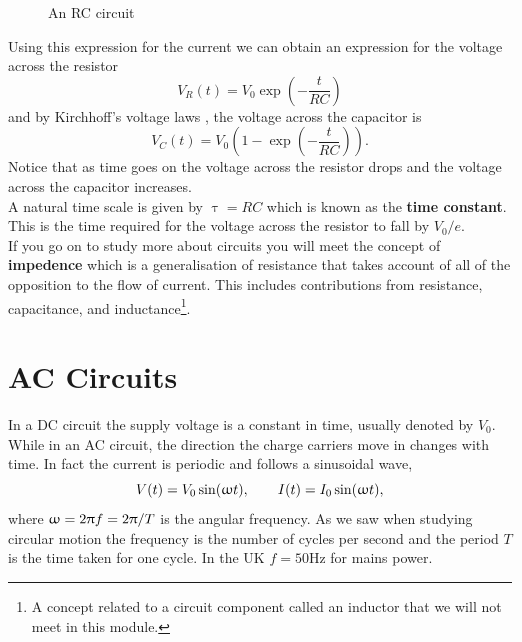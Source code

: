 \documentclass[a4paper,12pt]{book}
\begin{document}
     \begin{figure}[ht]
    \centering
    \caption{An RC circuit}
    \label{fig: RC circuit}
\end{figure}
Using this expression for the current we can obtain an expression for the voltage across the resistor
\begin{equation*}
V_{R}(t)=V_{0}\exp\left(-\frac{t}{RC}\right)
\end{equation*}
and by Kirchhoff's voltage laws , the voltage across the capacitor is
\begin{equation*}
V_{C}(t)=V_{0}\left(1-\exp\left(-\frac{t}{RC}\right)\right).
\end{equation*}
Notice that as time goes on the voltage across the resistor drops and the voltage across the capacitor increases.\\
 
A natural time scale is given by $\uptau=RC$ which is known as the \textbf{time constant}. This is the time required for the voltage across the resistor to fall by $V_{0}/e$.\\

If you go on to study more about circuits you will meet the concept of \textbf{impedence} which is a generalisation of resistance that takes account of all of the opposition to the flow of current. This includes contributions from resistance, capacitance, and inductance\footnote{A concept related to a circuit component called an inductor that we will not meet in this module.}.

\section{AC Circuits}
In a DC circuit the supply voltage is a constant in time, usually denoted by  $V_{0}$. While in an AC circuit, the direction the charge carriers move in changes with time. In fact the current is periodic and follows a sinusoidal wave, 
\begin{equation*}
V(t)=V_{0}\sin(\upomega t),\qquad I(t)=I_{0}\sin(\upomega t),
\end{equation*}
where $\upomega=2\uppi f=2\uppi/T$ is the angular frequency. As we saw when studying circular motion the frequency is the number of cycles per second and the period $T$ is the time taken for one cycle. In the UK $f=50\text{Hz}$ for mains power.\\
\end{document}
